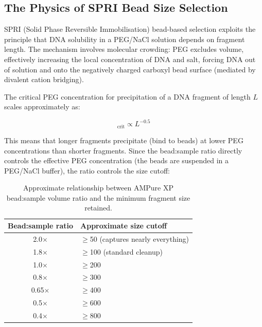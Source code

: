 \subsection{The Physics of SPRI Bead Size Selection}
\label{subsec:libprep:spri-physics}

SPRI (Solid Phase Reversible Immobilisation) bead-based selection exploits the principle that DNA solubility in a PEG/NaCl solution depends on fragment length. The mechanism involves molecular crowding: PEG excludes volume, effectively increasing the local concentration of DNA and salt, forcing DNA out of solution and onto the negatively charged carboxyl bead surface (mediated by divalent cation bridging).

The critical PEG concentration for precipitation of a DNA fragment of length $L$ scales approximately as:

\begin{equation}
[\text{PEG}]_{\text{crit}} \propto L^{-0.5}
\label{eq:libprep:spri-scaling}
\end{equation}

This means that longer fragments precipitate (bind to beads) at lower PEG concentrations than shorter fragments. Since the bead:sample ratio directly controls the effective PEG concentration (the beads are suspended in a PEG/NaCl buffer), the ratio controls the size cutoff:

\begin{table}[htbp]
\centering
\caption[SPRI bead ratio and size cutoff.]{Approximate relationship between AMPure XP bead:sample volume ratio and the minimum fragment size retained.}
\label{tab:libprep:spri-ratios}
\small
\begin{tabular}{cl}
\toprule
\textbf{Bead:sample ratio} & \textbf{Approximate size cutoff} \\
\midrule
2.0$\times$ & $\geq$50\basepair{} (captures nearly everything) \\
1.8$\times$ & $\geq$100\basepair{} (standard cleanup) \\
1.0$\times$ & $\geq$200\basepair{} \\
0.8$\times$ & $\geq$300\basepair{} \\
0.65$\times$ & $\geq$400\basepair{} \\
0.5$\times$ & $\geq$600\basepair{} \\
0.4$\times$ & $\geq$800\basepair{} \\
\bottomrule
\end{tabular}
\end{table}

